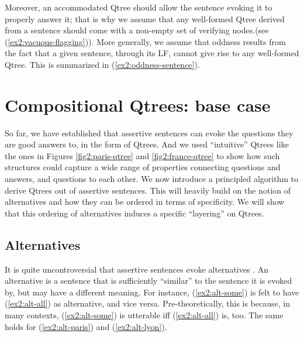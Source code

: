 Moreover, an accommodated Qtree should allow the sentence evoking it to properly answer it; that is why we assume that any well-formed Qtree derived from a sentence should come with a non-empty set of verifying nodes.(see (\ref{ex2:vacuous-flagging})). More generally, we assume that oddness results from the fact that a given sentence, through its LF, cannot give rise to any well-formed Qtree. This is summarized in (\ref{ex2:oddness-sentence}).


\begin{exe}
	\label{ex2:vacuous-flagging}
	\label{ex2:oddness-sentence}
\end{exe}



\section{Compositional Qtrees: base case}\label{sec:simplex}

So far, we have established that assertive sentences can evoke the questions they are good answers to, in the form of Qtrees. And we used ``intuitive'' Qtrees like the ones in Figures \ref{fig2:paris-qtree} and \ref{fig2:france-qtree} to show how such structures could capture a wide range of properties connecting questions and answers, and questions to each other. We now introduce a principled algorithm to derive Qtrees out of assertive sentences. This will heavily build on the notion of alternatives and how they can be ordered in terms of specificity. We will show that this ordering of alternatives induces a specific ``layering'' on Qtrees.

\subsection{Alternatives}

It is quite uncontroversial that assertive sentences evoke alternatives \parencite{Rooth1992,Katzir2007,Fox2011}. An alternative is a sentence that is sufficiently ``similar'' to the sentence it is evoked by, but may have a different meaning. For instance, (\ref{ex2:alt-some}) is felt to have (\ref{ex2:alt-all}) as alternative, and vice versa. Pre-theoretically, this is because, in many contexts, (\ref{ex2:alt-some}) is utterable iff (\ref{ex2:alt-all}) is, too. The same holds for (\ref{ex2:alt-paris}) and (\ref{ex2:alt-lyon}).

